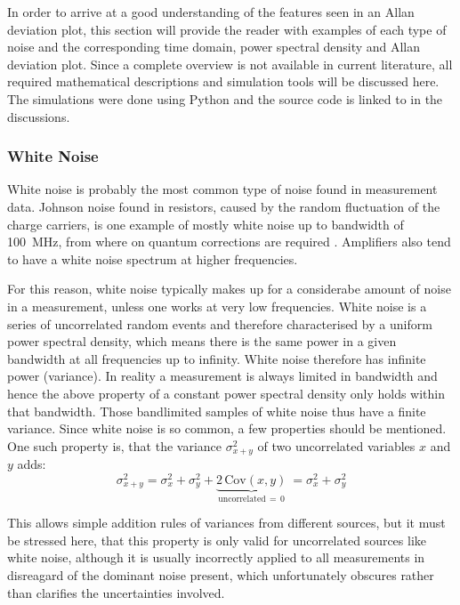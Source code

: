 In order to arrive at a good understanding of the features seen in an Allan deviation plot, this section will provide the reader with examples of each type of noise and the corresponding time domain, power spectral density and Allan deviation plot. Since a complete overview is not available in current literature, all required mathematical descriptions and simulation tools will be discussed here. The simulations were done using Python and the source code is linked to in the discussions.

\clearpage
\subsubsection{White Noise}
White noise is probably the most common type of noise found in measurement data. Johnson noise found in resistors, caused by the random fluctuation of the charge carriers, is one example of mostly white noise up to bandwidth of \qty{100}{\MHz}, from where on quantum corrections are required \cite{nist_johnson_noise}. Amplifiers also tend to have a white noise spectrum at higher frequencies.

For this reason, white noise typically makes up for a considerabe amount of noise in a measurement, unless one works at very low frequencies. White noise is a series of uncorrelated random events and therefore characterised by a uniform power spectral density, which means there is the same power in a given bandwidth at all frequencies up to infinity. White noise therefore has infinite power (variance). In reality a measurement is always limited in bandwidth and hence the above property of a constant power spectral density only holds within that bandwidth. Those bandlimited samples of white noise thus have a finite variance.
Since white noise is so common, a few properties should be mentioned. One such property is, that the variance $\sigma_{x+y}^2$ of two uncorrelated variables $x$ and $y$ adds:
\begin{equation}
    \sigma_{x+y}^2  = \sigma_x^2 + \sigma_y^2 + \underbrace{2\,\mathrm{Cov}(x,y)}_{\text{uncorrelated}\, =\, 0}\ = \sigma_x^2 + \sigma_y^2 \label{eqn:adding_white_noise}
\end{equation}

This allows simple addition rules of variances from different sources, but it must be stressed here, that this property is only valid for uncorrelated sources like white noise, although it is usually incorrectly applied to all measurements in disreagard of the dominant noise present, which unfortunately obscures rather than clarifies the uncertainties involved.

